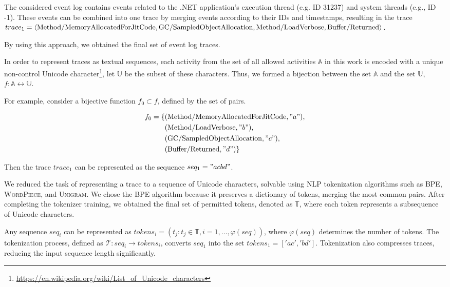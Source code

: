 \documentclass[sigplan,nonacm]{acmart}
\begin{document}
The considered event log contains events related to the .NET application's execution thread (e.g. ID 31237) and system threads (e.g., ID -1). These events can be combined into one trace by merging events according to their IDs and timestamps, resulting in the trace $trace_1 = \langle \text{Method/MemoryAllocatedForJitCode}, \\ \allowbreak
\text{GC/SampledObjectAllocation}, \allowbreak
\text{Method/LoadVerbose}, \\ \allowbreak
\text{Buffer/Returned} \rangle$.


By using this approach, we obtained the final set of event log traces.

In order to represent traces as textual sequences, each activity from the set of all allowed activities $\mathbb{A}$ in this work is encoded with a unique non-control Unicode character\footnote{\url{https://en.wikipedia.org/wiki/List_of_Unicode_characters}}, let $\mathbb{U}$ be the subset of these characters. Thus, we formed a bijection between the set $\mathbb{A}$ and the set $\mathbb{U}$,
$f: \mathbb{A} \longleftrightarrow \mathbb{U}$.

For example, consider a bijective function $f_0 \subset f$, defined by the set of pairs.

\begin{equation*}
\begin{aligned}
f_0 = \{ & (\text{Method/MemoryAllocatedForJitCode}, "a"), \\
      & (\text{Method/LoadVerbose}, "b"), \\
      & (\text{GC/SampledObjectAllocation}, "c"), \\
      & (\text{Buffer/Returned}, "d") \}
\end{aligned}
\end{equation*}

Then the trace $trace_1$ can be represented as the sequence $seq_1 = "acbd"$.

We reduced the task of representing a trace to a sequence of Unicode characters, solvable using NLP tokenization algorithms such as \textsc{BPE}, \textsc{WordPiece}, and \textsc{Unigram}. We chose the \textsc{BPE} algorithm because it preserves a dictionary of tokens, merging the most common pairs. After completing the tokenizer training, we obtained the final set of permitted tokens, denoted as $\mathbb{T}$, where each token represents a subsequence of Unicode characters.

Any sequence $seq_i$ can be represented as $tokens_i = (t_j: t_j \in \mathbb{T}, i = 1, \ldots, \varphi(seq))$, where $\varphi(seq)$ determines the number of tokens. The tokenization process, defined as $\mathcal{T}: seq_i \rightarrow tokens_i$, converts $seq_1$ into the set $tokens_1 = ['ac', 'bd']$. Tokenization also compresses traces, reducing the input sequence length significantly. 
\end{document}
